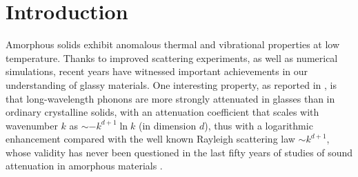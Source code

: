 \documentclass[twoside,twocolumn,9pt]{article}
\begin{document}




\section{Introduction}
Amorphous solids exhibit anomalous thermal and vibrational properties at low temperature. Thanks to improved scattering experiments, as well as numerical simulations, recent years have witnessed important achievements in our understanding of glassy materials. One interesting property, as reported in \cite{Gelin2016}, is that long-wavelength phonons are more strongly attenuated in glasses than in ordinary crystalline solids, with an attenuation coefficient that scales with wavenumber $k$ as $\sim -k^{d+1}\ln{k}$ (in dimension $d$), thus with a logarithmic enhancement compared with the well known Rayleigh scattering law $\sim k^{d+1}$, whose validity has never been questioned in the last fifty years of studies of sound attenuation in amorphous materials \cite{Strutt1871}.
\end{document}
